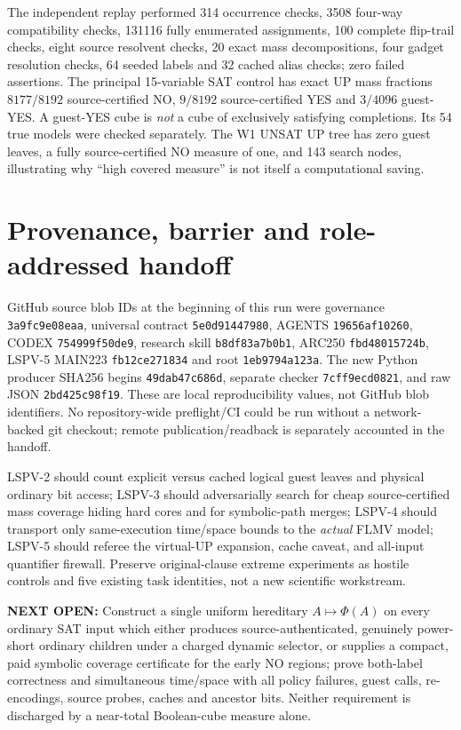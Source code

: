 \documentclass[11pt]{article}
\begin{document}
The independent replay performed 314 occurrence checks, 3508 four-way
compatibility checks, 131116 fully enumerated assignments, 100 complete
flip-trail checks, eight source resolvent checks, 20 exact mass decompositions,
four gadget resolution checks, 64 seeded labels and 32 cached alias checks;
zero failed assertions. The principal 15-variable SAT control has exact UP
mass fractions $8177/8192$ source-certified NO, $9/8192$ source-certified
YES and $3/4096$ guest-YES. A guest-YES cube is \emph{not} a cube of
exclusively satisfying completions. Its 54 true models were checked
separately. The W1 UNSAT UP tree has zero guest leaves, a fully source-certified
NO measure of one, and 143 search nodes, illustrating why ``high covered
measure'' is not itself a computational saving.

\section{Provenance, barrier and role-addressed handoff}
GitHub source blob IDs at the beginning of this run were governance
\texttt{3a9fc9e08eaa}, universal contract \texttt{5e0d91447980},
AGENTS \texttt{19656af10260}, CODEX \texttt{754999f50de9},
research skill \texttt{b8df83a7b0b1}, ARC250
\texttt{fbd48015724b}, LSPV-5 MAIN223 \texttt{fb12ce271834}
and root \texttt{1eb9794a123a}. The new Python producer SHA256 begins
\texttt{49dab47c686d}, separate checker \texttt{7cff9ecd0821}, and
raw JSON \texttt{2bd425c98f19}. These are local reproducibility values,
not GitHub blob identifiers. No repository-wide preflight/CI could be run
without a network-backed git checkout; remote publication/readback is
separately accounted in the handoff.

LSPV-2 should count explicit versus cached logical guest leaves and
physical ordinary bit access; LSPV-3 should adversarially search for cheap
source-certified mass coverage hiding hard cores and for symbolic-path merges;
LSPV-4 should transport only same-execution time/space bounds to the
\emph{actual} FLMV model; LSPV-5 should referee the virtual-UP expansion,
cache caveat, and all-input quantifier firewall. Preserve original-clause
extreme experiments as hostile controls and five existing task identities,
not a new scientific workstream.

\noindent\textbf{NEXT OPEN:} Construct a single uniform hereditary
$A\mapsto\Phi(A)$ on every ordinary SAT input which either produces
source-authenticated, genuinely power-short ordinary children under a
charged dynamic selector, or supplies a compact, paid symbolic coverage
certificate for the early NO regions; prove both-label correctness and
simultaneous time/space with all policy failures, guest calls, re-encodings,
source probes, caches and ancestor bits. Neither requirement is discharged
by a near-total Boolean-cube measure alone.
\end{document}
